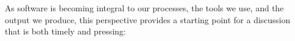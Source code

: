 \documentclass[a4paper,UKenglish]{dagman}
\begin{document}

As software is becoming integral to our processes, the tools we use, and the output we produce, this perspective provides a starting point for a discussion that is both timely and pressing:
\end{document}
